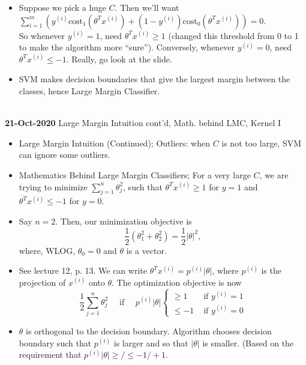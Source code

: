 \documentclass[10pt]{article}
\begin{document}
\begin{itemize}
  \item Suppose we pick a huge $C$. Then we'll want $\sum_{i=1}^m \left( y^{(i)} \text{cost}_1(\theta^Tx^{(i)}) + (1 - y^{(i)}) \text{cost}_0(\theta^Tx^{(i)}) \right)=0$. \\
    So whenever $y^{(i)}=1$, need $\theta^T x^{(i)} \geq 1$ (changed this threshold from 0 to 1 to make the algorithm more ``sure''). Conversely, whenever $y^{(i)}=0$, need $\theta^Tx^{(i)} \leq -1$.
    Really, go look at the slide.
  \item SVM makes decision boundaries that give the largest margin between the classes, hence Large Margin Classifier.
\end{itemize}
\hfill \\
{\large \textbf{21-Oct-2020} Large Margin Intuition cont'd, Math. behind LMC, Kernel I}
\begin{itemize}
  \item Large Margin Intuition (Continued); Outliers: when $C$ is not too large, SVM can ignore some outliers.
  \item Mathematics Behind Large Margin Classifiers; For a very large
    $C$, we are trying to minimize $\sum_{j=1}^n \theta_j^2$, such
    that $\theta^T x^{(i)} \geq 1$ for $y=1$ and $\theta^T x^{(i)}
    \leq -1$ for $y=0$.
  \item Say $n=2$. Then, our minimization objective is
    \begin{equation*}
      \frac{1}{2}\left( \theta_1^2 + \theta_2^2 \right) = \frac{1}{2} \left| \theta \right|^2,
    \end{equation*}
    where, WLOG, $\theta_0=0$ and $\theta$ is a vector.
  \item See lecture 12, p. 13. We can write $\theta^Tx^{(i)}=p^{(i)}\left| \theta \right|$, where $p^{(i)}$ is the projection of $x^{(i)}$ onto $\theta$. The optimization objective is now
    \begin{equation*}
      \frac{1}{2}\sum_{j=1}^n \theta_j^2 \quad \mbox{ if } \quad p^{(i)}\left| \theta \right|  \begin{cases} \geq 1 & \mbox{ if } y^{(i)}=1 \\ \leq -1 & \mbox{ if } y^{(i)}=0 \end{cases}
    \end{equation*}
  \item $\theta$ is orthogonal to the decision boundary. Algorithm
    chooses decision boundary such that $p^{(i)}$ is larger and so
    that $|\theta|$ is smaller. (Based on the requirement that
    $p^{(i)}\left| \theta \right| \geq/\leq -1/+1$.

\end{itemize}
\end{document}

